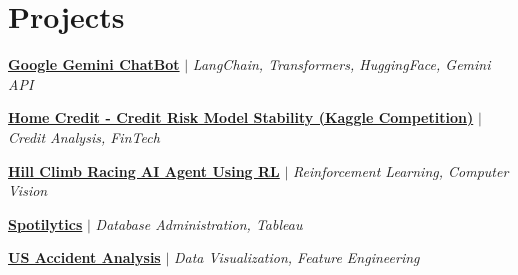 \section{Projects}
\resumeSubHeadingListStart
    \resumeProjectHeading
    {\href{https://gemini-chatbott.streamlit.app/}{\textbf{Google Gemini ChatBot}} $|$ \emph{LangChain, Transformers, HuggingFace, Gemini API}} {}
    \resumeItemListStart
    \resumeItemListEnd

    \resumeProjectHeading
    {\href{https://www.kaggle.com/jayshrivastava/competitions}{\textbf{Home Credit - Credit Risk Model Stability (Kaggle Competition)}} $|$ \emph{Credit Analysis, FinTech}} {}
    \resumeItemListStart
    \resumeItemListEnd

    \resumeProjectHeading
    {\href{https://github.com/jayshrivastava0/Hill-Climb-Racing?tab=readme-ov-file\#yolo}{\textbf{Hill Climb Racing AI Agent Using RL}} $|$ \emph{Reinforcement Learning, Computer Vision}} {}
    \resumeItemListStart
    \resumeItemListEnd

    \resumeProjectHeading
    {\href{https://spotilyticss.streamlit.app/}{\textbf{Spotilytics}} $|$ \emph{Database Administration, Tableau}} {}
    \resumeItemListStart
    \resumeItemListEnd

    \resumeProjectHeading
    {\href{https://www.kaggle.com/code/jayshrivastava/us-accident-analysis}{\textbf{US Accident Analysis}} $|$ \emph{Data Visualization, Feature Engineering}} {}
    \resumeItemListStart
    \resumeItemListEnd
\resumeSubHeadingListEnd
